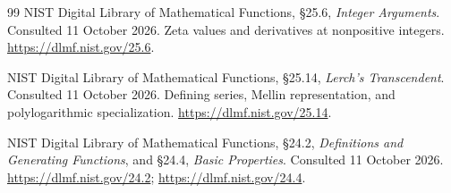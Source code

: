 \begin{thebibliography}{99}
NIST Digital Library of Mathematical Functions, \S25.6,
\emph{Integer Arguments}. Consulted 11 October 2026.
Zeta values and derivatives at nonpositive integers.
\url{https://dlmf.nist.gov/25.6}.

NIST Digital Library of Mathematical Functions, \S25.14,
\emph{Lerch's Transcendent}. Consulted 11 October 2026.
Defining series, Mellin representation, and polylogarithmic specialization.
\url{https://dlmf.nist.gov/25.14}.

NIST Digital Library of Mathematical Functions, \S24.2,
\emph{Definitions and Generating Functions}, and \S24.4,
\emph{Basic Properties}. Consulted 11 October 2026.
\url{https://dlmf.nist.gov/24.2}; \url{https://dlmf.nist.gov/24.4}.
\end{thebibliography}
